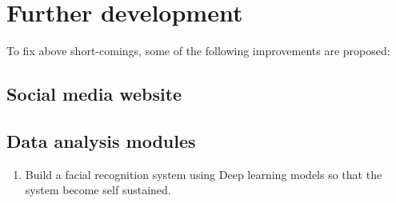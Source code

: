 \section{Further development}
To fix above short-comings, some of the following improvements are proposed:
\subsection{Social media website}
\subsection{Data analysis modules}
\begin{enumerate}
\item Build a facial recognition system using Deep learning models so that the system become self sustained.
\end{enumerate}

